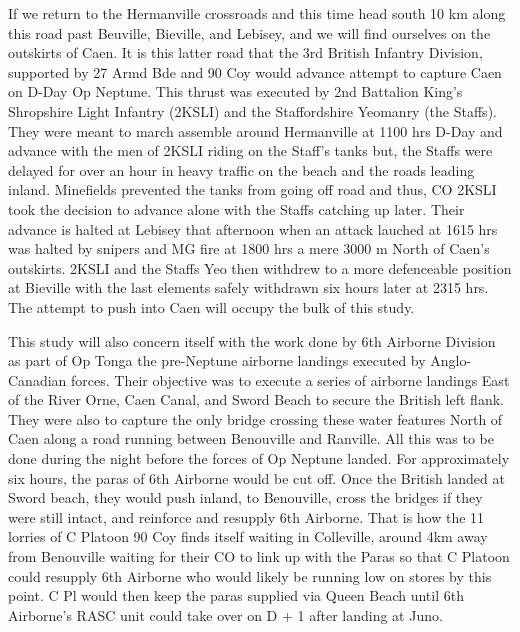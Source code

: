 \documentclass[noraggedright]{turabian-researchpaper}
\begin{document}
If we return to the Hermanville crossroads and this time head south 
10 km along this road past Beuville, Bieville, and Lebisey, and we will find 
ourselves on the outskirts of Caen.  It is this latter road that the 3rd 
British Infantry Division, supported by 27 Armd Bde and 90 Coy would advance
attempt to capture Caen on D-Day Op Neptune.  This thrust was executed by 
2nd Battalion King's Shropshire Light Infantry (2KSLI) and the Staffordshire
Yeomanry (the Staffs).  They were meant to march assemble around Hermanville
at 1100 hrs D-Day and advance with the men of 2KSLI riding on the Staff's 
tanks but, the Staffs were delayed for over an hour in heavy traffic on the
beach and the roads leading inland.  Minefields prevented the tanks from
going off road and thus, CO 2KSLI took the decision to advance alone with the
Staffs catching up later.\autocite[1100 -- 1230 hrs 6 June 1944]{2KSLIwd}
Their advance is halted at Lebisey that afternoon when an attack lauched at 
1615 hrs was halted by snipers and MG fire at 1800 hrs a mere 3000 m North of 
Caen's outskirts.  2KSLI and the Staffs Yeo then withdrew to a more 
defenceable position at Bieville with the last elements safely withdrawn
six hours later at 2315 hrs.\autocites[6 June 1944]{staffswd}[1630 -- 2315]
{2KSLIwd} The attempt to push into Caen will occupy the bulk of this study.

This study will also concern itself with the work done by 6th Airborne
Division as part of Op Tonga the pre-Neptune airborne landings executed
by Anglo-Canadian forces.  Their objective was to execute a series of
airborne landings East of the River Orne, Caen Canal, and Sword Beach to 
secure the British left flank.  They were also to capture the only bridge 
crossing
these water features North of Caen along a road running between Benouville
and Ranville.  All this was to be done during the night before the forces of
Op Neptune landed.  For approximately six hours, the paras of 6th Airborne
would be cut off.  Once the British landed at Sword beach, they would push
inland, to Benouville, cross the bridges if they were still intact, and
reinforce and resupply 6th Airborne.  That is how the 11 lorries of C Platoon 
90 Coy finds itself waiting in Colleville, around 4km away from Benouville
waiting for their CO to link up with the Paras so that C Platoon could 
resupply 6th Airborne who would likely be running low on stores by this point.
C Pl would then keep the paras supplied via Queen Beach until 6th Airborne's 
RASC unit could take over on D + 1 after landing at Juno.\autocite[1]{90wdjun}
\end{document}
